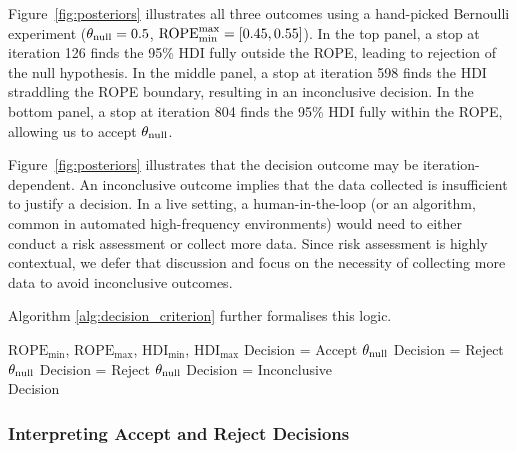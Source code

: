 Figure~\ref{fig:posteriors} illustrates all three outcomes using a hand-picked Bernoulli
experiment ($\theta_{\rm null}=0.5$, ${\rm ROPE}_{\rm min}^{\rm max}=[0.45,0.55]$).
In the top panel, a stop at iteration 126 finds the 95\% HDI fully outside the ROPE, leading to rejection of the null hypothesis.
In the middle panel, a stop at iteration 598 finds the HDI straddling the ROPE boundary, resulting in an inconclusive decision.
In the bottom panel, a stop at iteration 804 finds the 95\% HDI fully within the ROPE, allowing us to accept $\theta_{\rm null}$.

Figure~\ref{fig:posteriors} illustrates that the decision outcome may be iteration-dependent. An inconclusive outcome implies that the data collected is insufficient to justify a decision. In a live setting, a human-in-the-loop (or an algorithm, common in automated high-frequency environments) would need to either conduct a risk assessment or collect more data. Since risk assessment is highly contextual, we defer that discussion and focus on the necessity of collecting more data to avoid inconclusive outcomes.

Algorithm \ref{alg:decision_criterion} further formalises this logic.

\begin{algorithm}
    \caption{The Decision Rule}\label{alg:decision_criterion}
    \begin{algorithmic}
    \Require $\mathrm{ROPE}_\mathrm{min}$, $\mathrm{ROPE}_\mathrm{max}$, $\mathrm{HDI}_\mathrm{min}$, $\mathrm{HDI}_\mathrm{max}$
        \State Decision = Accept $\theta_{\rm null}$ 
        \State Decision = Reject $\theta_{\rm null}$ 
        \State Decision = Reject $\theta_{\rm null}$ 
    \Else
    \State Decision = Inconclusive  
    \EndIf \\
    \Return Decision
    \end{algorithmic} 
\end{algorithm}

\subsubsection{Interpreting Accept and Reject Decisions}\label{sec:accept_reject_meaning}

